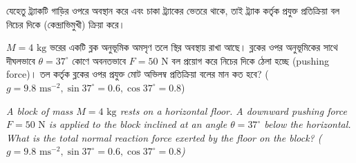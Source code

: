 \documentclass[12pt, a4paper]{article}
\begin{document}
{\begin{tcolorbox}[solutionbox={সমাধান (Solution)}]
যেহেতু ট্র্যাকটি গাড়ির ওপরে অবস্থান করে এবং চাকা ট্র্যাকের ভেতরে থাকে, তাই ট্র্যাক কর্তৃক প্রযুক্ত প্রতিক্রিয়া বল নিচের দিকে (কেন্দ্রাভিমুখী) ক্রিয়া করে।
\end{tcolorbox}


\begin{tcolorbox}[questionbox={প্রশ্ন (Question) 13}]
\noindent
$M = 4\text{ kg}$ ভরের একটি ব্লক অনুভূমিক অমসৃণ তলে স্থির অবস্থায় রাখা আছে। ব্লকের ওপর অনুভূমিকের সাথে দীঘলভাবে $\theta = 37^\circ$ কোণে অবনতভাবে $F = 50\text{ N}$ বল প্রয়োগ করে নিচের দিকে ঠেলা হচ্ছে (pushing force)। তল কর্তৃক ব্লকের ওপর প্রযুক্ত মোট অভিলম্ব প্রতিক্রিয়া বলের মান কত হবে? ($g = 9.8\text{ ms}^{-2}, \sin 37^\circ = 0.6, \cos 37^\circ = 0.8$)

\vspace{0.8em}
\begin{english}
\noindent\textit{\color{darkgray}
A block of mass $M = 4\text{ kg}$ rests on a horizontal floor. A downward pushing force $F = 50\text{ N}$ is applied to the block inclined at an angle $\theta = 37^\circ$ below the horizontal. What is the total normal reaction force exerted by the floor on the block? ($g = 9.8\text{ ms}^{-2}, \sin 37^\circ = 0.6, \cos 37^\circ = 0.8$)
}
\end{english}
\end{tcolorbox}

\vspace{1em}
\begin{center}
\end{center}}
\end{document}
